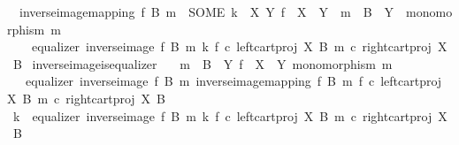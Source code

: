 \begin{isabellebody}
\ \ {\isachardoublequoteopen}inverse{\isacharunderscore}{\kern0pt}image{\isacharunderscore}{\kern0pt}mapping\ f\ B\ m\ {\isacharequal}{\kern0pt}\ {\isacharparenleft}{\kern0pt}SOME\ k{\isachardot}{\kern0pt}\ {\isasymexists}\ X\ Y{\isachardot}{\kern0pt}\ f\ {\isacharcolon}{\kern0pt}\ X\ {\isasymrightarrow}\ Y\ {\isasymand}\ m\ {\isacharcolon}{\kern0pt}\ B\ {\isasymrightarrow}\ Y\ {\isasymand}\ monomorphism\ m\ {\isasymand}\isanewline
\ \ \ \ equalizer\ {\isacharparenleft}{\kern0pt}inverse{\isacharunderscore}{\kern0pt}image\ f\ B\ m{\isacharparenright}{\kern0pt}\ k\ {\isacharparenleft}{\kern0pt}f\ {\isasymcirc}\isactrlsub c\ left{\isacharunderscore}{\kern0pt}cart{\isacharunderscore}{\kern0pt}proj\ X\ B{\isacharparenright}{\kern0pt}\ {\isacharparenleft}{\kern0pt}m\ {\isasymcirc}\isactrlsub c\ right{\isacharunderscore}{\kern0pt}cart{\isacharunderscore}{\kern0pt}proj\ X\ B{\isacharparenright}{\kern0pt}{\isacharparenright}{\kern0pt}{\isachardoublequoteclose}\isanewline
\isanewline
{}\isamarkupfalse%
\ inverse{\isacharunderscore}{\kern0pt}image{\isacharunderscore}{\kern0pt}is{\isacharunderscore}{\kern0pt}equalizer{}{\isacharcolon}{\kern0pt}\isanewline
\ \ \ {\isachardoublequoteopen}m\ {\isacharcolon}{\kern0pt}\ B\ {\isasymrightarrow}\ Y{\isachardoublequoteclose}\ {\isachardoublequoteopen}f\ {\isacharcolon}{\kern0pt}\ X\ {\isasymrightarrow}\ Y{\isachardoublequoteclose}\ {\isachardoublequoteopen}monomorphism\ m{\isachardoublequoteclose}\isanewline
\ \ \ {\isachardoublequoteopen}equalizer\ {\isacharparenleft}{\kern0pt}inverse{\isacharunderscore}{\kern0pt}image\ f\ B\ m{\isacharparenright}{\kern0pt}\ {\isacharparenleft}{\kern0pt}inverse{\isacharunderscore}{\kern0pt}image{\isacharunderscore}{\kern0pt}mapping\ f\ B\ m{\isacharparenright}{\kern0pt}\ {\isacharparenleft}{\kern0pt}f\ {\isasymcirc}\isactrlsub c\ left{\isacharunderscore}{\kern0pt}cart{\isacharunderscore}{\kern0pt}proj\ X\ B{\isacharparenright}{\kern0pt}\ {\isacharparenleft}{\kern0pt}m\ {\isasymcirc}\isactrlsub c\ right{\isacharunderscore}{\kern0pt}cart{\isacharunderscore}{\kern0pt}proj\ X\ B{\isacharparenright}{\kern0pt}{\isachardoublequoteclose}\isanewline
%
\isadelimproof
%
\endisadelimproof
%
\isatagproof
{}\isamarkupfalse%
\ {\isacharminus}{\kern0pt}\isanewline
\ \ \isamarkupfalse%
\ k\ \ {\isachardoublequoteopen}equalizer\ {\isacharparenleft}{\kern0pt}inverse{\isacharunderscore}{\kern0pt}image\ f\ B\ m{\isacharparenright}{\kern0pt}\ k\ {\isacharparenleft}{\kern0pt}f\ {\isasymcirc}\isactrlsub c\ left{\isacharunderscore}{\kern0pt}cart{\isacharunderscore}{\kern0pt}proj\ X\ B{\isacharparenright}{\kern0pt}\ {\isacharparenleft}{\kern0pt}m\ {\isasymcirc}\isactrlsub c\ right{\isacharunderscore}{\kern0pt}cart{\isacharunderscore}{\kern0pt}proj\ X\ B{\isacharparenright}{\kern0pt}{\isachardoublequoteclose}\isanewline

\end{isabellebody}
